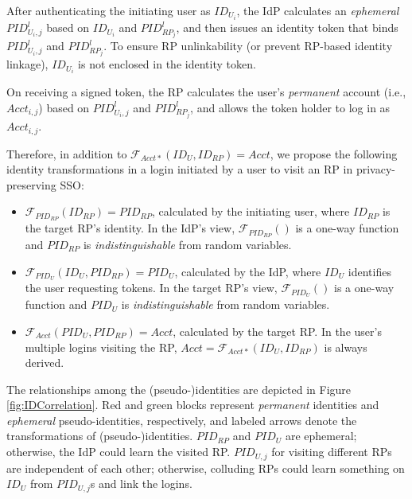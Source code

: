 After authenticating the initiating user as $ID_{U_i}$, the IdP calculates an \emph{ephemeral} $PID^l_{U_i,j}$ based on $ID_{U_i}$ and $PID^l_{RP_j}$, and then issues an identity token that binds $PID^l_{U_i,j}$ and $PID^l_{RP_j}$.
To ensure RP unlinkability (or prevent RP-based identity linkage),
    $ID_{U_i}$ is not enclosed in the identity token.

On receiving a signed token, the RP calculates the user's \emph{permanent} account (i.e., $Acct_{i,j}$) based on $PID^l_{U_i,j}$ and $PID^l_{RP_j}$,
and allows the token holder to log in as $Acct_{i,j}$.

Therefore, in addition to $\mathcal{F}_{Acct\ast}(ID_{U}, ID_{RP}) = Acct$,
we propose the following identity transformations in a login initiated by a user to visit an RP in privacy-preserving SSO:
\begin{itemize}
\setlength{\topsep}{0pt}
\setlength{\partopsep}{0pt}
\setlength{\itemsep}{0pt}
\setlength{\parsep}{0pt}
\setlength{\parskip}{0pt}

\item
$\mathcal{F}_{PID_{RP}}(ID_{RP}) = PID_{RP}$, calculated by the initiating user,
    where $ID_{RP}$ is the target RP's identity.
In the IdP's view,
$\mathcal{F}_{PID_{RP}}()$ is a one-way function and $PID_{RP}$
is \emph{indistinguishable} from random variables.
\item
$\mathcal{F}_{PID_U}(ID_U, PID_{RP}) = PID_{U}$, calculated by the IdP,
    where $ID_U$ identifies the user requesting tokens.
In the target RP's view,
    $\mathcal{F}_{PID_U}()$ is a one-way function and $PID_{U}$ is \emph{indistinguishable} from random variables.
\item
$\mathcal{F}_{Acct}(PID_{U}, PID_{RP}) = Acct$, calculated by the target RP.
In the user's multiple logins visiting the RP,
    $Acct = \mathcal{F}_{Acct\ast}(ID_{U}, ID_{RP})$ is always derived.
\end{itemize}

The relationships among the (pseudo-)identities are depicted in Figure \ref{fig:IDCorrelation}.
Red and green blocks represent \emph{permanent} identities and \emph{ephemeral} pseudo-identities, respectively, and 
labeled arrows denote the transformations of (pseudo-)identities.
$PID_{RP}$ and $PID_{U}$ are ephemeral;
    otherwise, the IdP could learn the visited RP.
$PID_{U,j}$ for visiting different RPs are independent of each other;
    otherwise, colluding RPs could learn something on $ID_U$ from $PID_{U,j}$s and link the logins.

